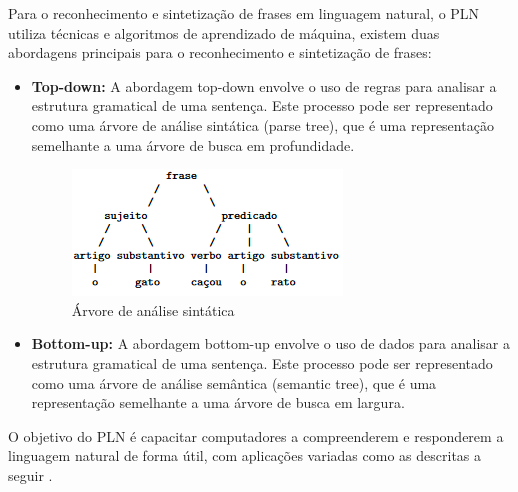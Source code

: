 \documentclass[conference]{IEEEtran}
\begin{document}
Para o reconhecimento e sintetização de frases em linguagem natural, o PLN utiliza técnicas e algoritmos
de aprendizado de máquina, existem duas abordagens principais para o reconhecimento e sintetização de frases:
\begin{itemize}
    \item {\textbf{Top-down:}}
    A abordagem top-down envolve o uso de regras para analisar a estrutura gramatical de uma sentença. Este
    processo pode ser representado como uma árvore de análise sintática (parse tree), que é uma representação
    semelhante a uma árvore de busca em profundidade.

    \begin{figure}[htbp]
        \centerline{\includegraphics[scale=1]{parse_tree.png}}
        \caption{Árvore de análise sintática}
        \label{fig}
    \end{figure}

    \item {\textbf{Bottom-up:}}
    A abordagem bottom-up envolve o uso de dados para analisar a estrutura gramatical de uma sentença. Este
    processo pode ser representado como uma árvore de análise semântica (semantic tree), que é uma representação
    semelhante a uma árvore de busca em largura.

\end{itemize}

O objetivo do PLN é capacitar computadores a compreenderem e responderem a linguagem natural de forma útil, 
com aplicações variadas como as descritas a seguir \cite{Jurafsky2019}.
\end{document}
